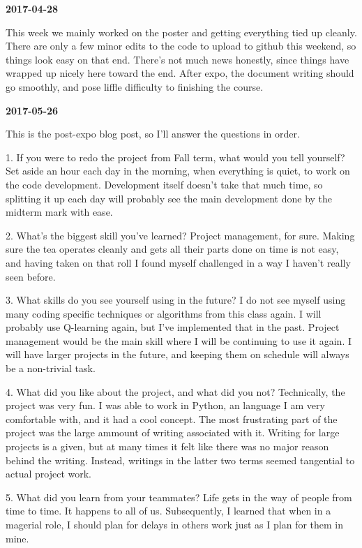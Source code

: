 \textbf{2017-04-28}

This week we mainly worked on the poster and getting everything tied up cleanly. There are only a few minor edits to the code to upload to github this weekend, so things look easy on that end. There's not much news honestly, since things have wrapped up nicely here toward the end. After expo, the document writing should go smoothly, and pose liffle difficulty to finishing the course.

\textbf{2017-05-26}

This is the post-expo blog post, so I'll answer the questions in order.

1. If you were to redo the project from Fall term, what would you tell yourself?
Set aside an hour each day in the morning, when everything is quiet, to work on the code development. Development itself doesn't take that much time, so splitting it up each day will probably see the main development done by the midterm mark with ease.

2. What's the biggest skill you've learned?
Project management, for sure. Making sure the tea operates cleanly and gets all their parts done on time is not easy, and having taken on that roll I found myself challenged in a way I haven't really seen before.

3. What skills do you see yourself using in the future?
I do not see myself using many coding specific techniques or algorithms from this class again. I will probably use Q-learning again, but I've implemented that in the past. Project management would be the main skill where I will be continuing to use it again. I will have larger projects in the future, and keeping them on schedule will always be a non-trivial task.

4. What did you like about the project, and what did you not?
Technically, the project was very fun. I was able to work in Python, an language I am very comfortable with, and it had a cool concept. The most frustrating part of the project was the large ammount of writing associated with it. Writing for large projects is a given, but at many times it felt like there was no major reason behind the writing. Instead, writings in the latter two terms seemed tangential to actual project work.

5. What did you learn from your teammates?
Life gets in the way of people from time to time. It happens to all of us. Subsequently, I learned that when in a magerial role, I should plan for delays in others work just as I plan for them in mine.

